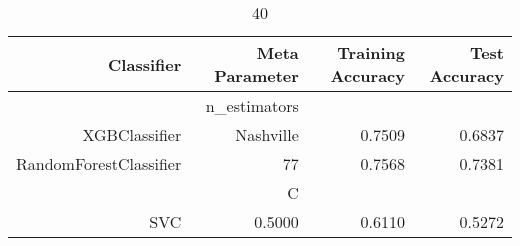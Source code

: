 
\begin{table}[H]
    \caption{40}
    \centering
    \begin{tabular}{|r|r|r|r|}
        \hline
        Classifier &Meta Parameter &Training Accuracy
        &Test Accuracy\\
        \hline
        &n\_estimators &\multicolumn{2}{|r|}{}\\
        \hline
        XGBClassifier &Nashville &0.7509 &0.6837\\
        \hline
        RandomForestClassifier &77 &0.7568 &0.7381\\
        \hline
        &C &\multicolumn{2}{|r|}{}\\
        \hline
        SVC &0.5000 &0.6110 &0.5272\\
        \hline
    \end{tabular}
\end{table}
